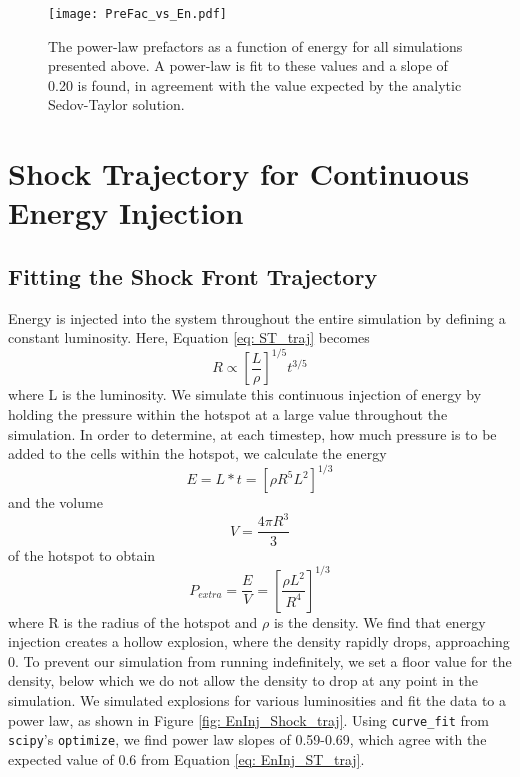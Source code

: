 \documentclass{article}
\begin{document}
\begin{figure}[h]
    \centering
    \texttt{[image: PreFac\_vs\_En.pdf]}
    \caption{The power-law prefactors as a function of energy for all simulations presented above. A power-law is fit to these values and a slope of 0.20 is found, in agreement with the value expected by the analytic Sedov-Taylor solution.}
    \label{fig: PreFac_vs_En}
\end{figure}

\section{Shock Trajectory for Continuous Energy Injection}
\subsection{Fitting the Shock Front Trajectory}
Energy is injected into the system throughout the entire simulation by defining a constant luminosity. Here, Equation \ref{eq: ST_traj} becomes
\begin{equation}\label{eq: EnInj_ST_traj}
    R \propto \left[ \frac{L}{\rho} \right]^{1/5} t^{3/5}
\end{equation}
where L is the luminosity. We simulate this continuous injection of energy by holding the pressure within the hotspot at a large value throughout the simulation. In order to determine, at each timestep, how much pressure is to be added to the cells within the hotspot, we calculate the energy
\begin{equation}
    E = L*t = \left[ \rho R^5 L^2 \right]^{1/3}
\end{equation}
and the volume 
\begin{equation}
    V = \frac{4\pi R^3}{3}
\end{equation}
of the hotspot to obtain
\begin{equation}
    P_{extra} = \frac{E}{V} = \left[ \frac{\rho L^2}{R^4} \right]^{1/3}
\end{equation}
where R is the radius of the hotspot and $\rho$ is the density. We find that energy injection creates a hollow explosion, where the density rapidly drops, approaching 0. To prevent our simulation from running indefinitely, we set a floor value for the density, below which we do not allow the density to drop at any point in the simulation. We simulated explosions for various luminosities and fit the data to a power law, as shown in Figure \ref{fig: EnInj_Shock_traj}. Using \texttt{curve\_fit} from \texttt{scipy}'s \texttt{optimize}, we find power law slopes of 0.59-0.69, which agree with the expected value of 0.6 from Equation \ref{eq: EnInj_ST_traj}.
\end{document}

